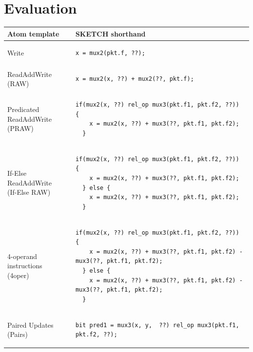 \section{Evaluation}
\label{s:eval}

\begin{table}[!t]
  \begin{scriptsize}
  \begin{tabular}{|p{}|p{}|}
  \hline
  Atom template & SKETCH shorthand\\
  \hline
  Write &
  {\begin{lstlisting}[style=customctable]
  x = mux2(pkt.f, ??);
  \end{lstlisting}} \\
  \hline
  ReadAddWrite (RAW) &
  {\begin{lstlisting}[style=customctable]
  x = mux2(x, ??) + mux2(??, pkt.f);
  \end{lstlisting}} \\
  \hline
  \pbox{0.15\textwidth}
  {Predicated\\
  ReadAddWrite (PRAW)} &
  {\begin{lstlisting}[style=customctable]
  if(mux2(x, ??) rel_op mux3(pkt.f1, pkt.f2, ??)) {
    x = mux2(x, ??) + mux3(??, pkt.f1, pkt.f2);
  }
  \end{lstlisting}} \\
  \hline
  \pbox{0.15\textwidth}
  {If-Else\\
   ReadAddWrite\\
   (If-Else RAW)} &
  {\begin{lstlisting}[style=customctable]
  if(mux2(x, ??) rel_op mux3(pkt.f1, pkt.f2, ??)) {
    x = mux2(x, ??) + mux3(??, pkt.f1, pkt.f2);
  } else {
    x = mux2(x, ??) + mux3(??, pkt.f1, pkt.f2);
  }
  \end{lstlisting}} \\
  \hline
  \pbox{0.15\textwidth}
  {4-operand instructions\\
   (4oper)} &
  {\begin{lstlisting}[style=customctable]
  if(mux2(x, ??) rel_op mux3(pkt.f1, pkt.f2, ??)) {
    x = mux2(x, ??) + mux3(??, pkt.f1, pkt.f2) - mux3(??, pkt.f1, pkt.f2);
  } else { 
    x = mux2(x, ??) + mux3(??, pkt.f1, pkt.f2) - mux3(??, pkt.f1, pkt.f2);
  }
  \end{lstlisting}} \\
  \hline
  Paired Updates (Pairs) &
  {\begin{lstlisting}[style=customctable]
  bit pred1 = mux3(x, y,  ??) rel_op mux3(pkt.f1, pkt.f2, ??);

\end{lstlisting}}
\end{tabular}
\end{scriptsize}
\end{table}
